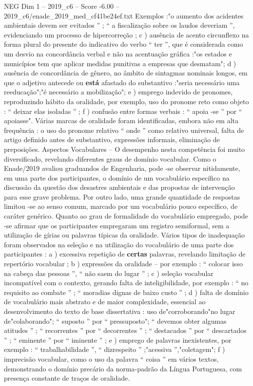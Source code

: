 \begin{textsample}{NEG Dim 1 – 2019\_c6 – Score -6.00 – 2019\_c6/enade\_2019\_med\_cf41be24ef.txt}
Exemplos :"o aumento dos acidentes ambientais devem ser evitados ” ; “ a fiscalização sobre os laudos deveriam ”, evidenciando um processo de hipercorreção ; c ) ausência de acento circunflexo na forma plural do presente do indicativo do verbo “ ter ”, que é considerada como um desvio na concordância verbal e não na acentuação gráfica :"os estados e municípios tem que aplicar medidas punitivas a empresas que desmatam"; d ) ausência de concordância de gênero, no âmbito de sintagmas nominais longos, em que o adjetivo antecede ou \textbf{está} afastado do substantivo :"seria necessário uma reeducação";"é necessário a mobilização"; e ) emprego indevido de pronomes, reproduzindo hábito da oralidade, por exemplo, uso do pronome reto como objeto : “ deixar elas isoladas ” ; f ) confusão entre formas verbais : “ apoia -se ” por “ apoiasse".
Várias marcas de oralidade foram identificadas, embora não em alta frequência : o uso do pronome relativo “ onde ” como relativo universal, falta de artigo definido antes de substantivo, expressões informais, eliminação de preposições.
Aspectos Vocabulares – O desempenho nesta competência foi muito diversificado, revelando diferentes graus de domínio vocabular.
Como o Enade/2019 avaliou graduandos de Engenharia, pode -se observar nitidamente, em uma parte dos participantes, o domínio de um vocabulário específico na discussão da questão dos desastres ambientais e das propostas de intervenção para esse grave problema.
Por outro lado, uma grande quantidade de respostas limitou -se ao senso comum, marcado por um vocabulário pouco específico, de caráter genérico.
Quanto ao grau de formalidade do vocabulário empregado, pode -se afirmar que os participantes empregaram um registro semiformal, sem a utilização de gírias ou palavras típicas da oralidade.
Vários tipos de inadequação foram observados na seleção e na utilização do vocabulário de uma parte dos participantes : a ) excessiva repetição de \textbf{certas} palavras, revelando limitação de repertório vocabular ; b ) expressões da oralidade – por exemplo : “ colocar isso na cabeça das pessoas ”, “ não saem do lugar ” ; c ) seleção vocabular incompatível com o contexto, gerando falta de inteligibilidade, por exemplo : “ no requisito ao combate ” ; “ moradias dignas de baixo custo ” ; d ) falta de domínio de vocabulário mais abstrato e de maior complexidade, essencial ao desenvolvimento do texto de base dissertativa : uso de"corroborando"no lugar de"colaborando"; “ suposto ” por “ pressuposto"; “ devemos obter algumas atitudes ” ; “ recorrentes ” por “ decorrentes ” ; “ destacados ” por “ descartados ” ; “ eminente ” por “ iminente ” ; e ) emprego de palavras inexistentes, por exemplo : “ trabalhabilidade ”, “ dizrespeito ” ;"acessiva ”,"coletagem"; f ) imprecisão vocabular, como o uso da palavra “ coisa ” em vários textos, demonstrando o domínio precário da norma-padrão da Língua Portuguesa, com presença constante de traços de oralidade.

\end{textsample}
